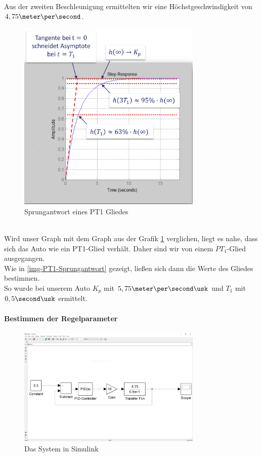 \documentclass[a4paper,12pt]{report}
\begin{document}
	Aus der zweiten Beschleunigung ermittelten wir eine Höchstgeschwindigkeit von $4,75 \meter\per\second$.
	\begin{figure}[ht]
		\centering
		\includegraphics[width=250pt,keepaspectratio]{assets/PT1-Sprungantwort.PNG}
		\caption{Sprungantwort eines PT1 Gliedes \cite{Regelungstechnik}}
		\label{img-PT1-Sprungantwort}
	\end{figure}\\
	Wird unser Graph mit dem Graph aus der Grafik \ref{img-PT1-Sprungantwort} verglichen, liegt es nahe, dass sich das Auto wie ein PT1-Glied verhält. Daher sind wir von einem $PT_1$-Glied ausgegangen. \\
	Wie in \autoref{img-PT1-Sprungantwort} gezeigt, ließen sich dann die Werte des Gliedes bestimmen.\\
	So wurde bei unserem Auto $K_p$ mit $5,75 \meter\per\second\usk$ und $T_1$ mit $0,5\second\usk$ ermittelt.\\

	\paragraph{Bestimmen der Regelparameter}
	\begin{figure}[ht]
		\centering
		\includegraphics[width=250pt,keepaspectratio]{assets/Simulink.PNG}
		\caption{Das System in Simulink}
		\label{img-Simulink}
	\end{figure}
\end{document}
